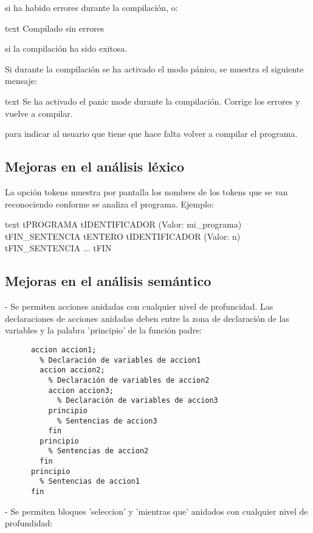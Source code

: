\documentclass[../main.tex]{subfiles}
\begin{document}
si ha habido errores durante la compilación, o:

\begin{codigo}{text}
Compilado sin errores
\end{codigo}

si la compilación ha sido exitosa.

Si durante la compilación se ha activado el modo pánico, se muestra el siguiente mensaje:

\begin{codigo}{text}
Se ha activado el panic mode durante la compilación. Corrige los errores y vuelve a compilar.
\end{codigo}

para indicar al usuario que tiene que hace falta volver a compilar el programa.



\subsection{Mejoras en el análisis léxico}
La opción tokens muestra por pantalla los nombres de los tokens que se van reconociendo conforme se analiza el programa. Ejemplo:

\begin{codigo}{text}
tPROGRAMA
tIDENTIFICADOR (Valor: mi_programa)
tFIN_SENTENCIA
tENTERO
tIDENTIFICADOR (Valor: n)
tFIN_SENTENCIA
...
tFIN
\end{codigo}

\subsection{Mejoras en el análisis semántico}
  - Se permiten acciones anidadas con cualquier nivel de profuncidad. Las declaraciones de acciones
    anidadas deben entre la zona de declaración de las variables y la palabra 'principio' de la
    función padre:

  \begin{verbatim}
      accion accion1;
        % Declaración de variables de accion1
        accion accion2;
          % Declaración de variables de accion2
          accion accion3;
            % Declaración de variables de accion3
          principio
            % Sentencias de accion3
          fin
        principio
          % Sentencias de accion2
        fin
      principio
        % Sentencias de accion1
      fin
  \end{verbatim}

  - Se permiten bloques 'seleccion' y 'mientras que' anidados con cualquier nivel de profundidad:
\end{document}
